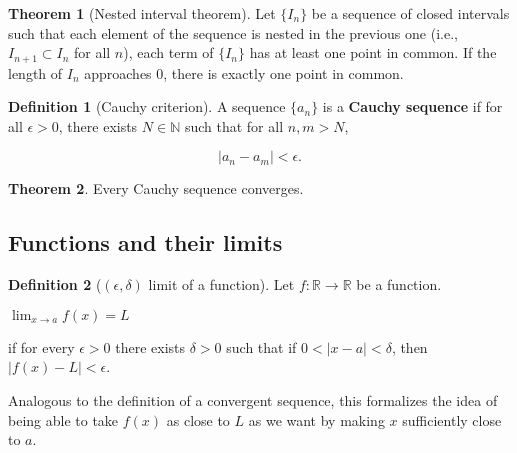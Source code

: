 \documentclass{article}
\theoremstyle{definition}
\newtheorem{definition}{Definition}[section]
\newtheorem{theorem}{Theorem}[section]
\begin{document}
\begin{theorem}[Nested interval theorem]
Let $\{I_n\}$ be a sequence of closed intervals such that each element of the sequence is nested in the previous one (i.e., $I_{n+1} \subset I_n$ for all $n$), each term of $\{I_n\}$ has at least one point in common. If the length of $I_n$ approaches 0, there is exactly one point in common.
\end{theorem}

\begin{definition}[Cauchy criterion]
A sequence $\{a_n\}$ is a \textbf{Cauchy sequence} if for all $\epsilon > 0$, there exists $N \in \mathbb{N}$ such that for all $n, m > N$, 

\begin{equation}
|a_n - a_m| < \epsilon.
\end{equation}
\end{definition}

\begin{theorem}
Every Cauchy sequence converges.
\end{theorem}

\subsection{Functions and their limits}

\begin{definition}[$(\epsilon, \delta)$ limit of a function]

Let $f: \mathbb{R} \to \mathbb{R}$ be a function. 

\begin{center}
$\lim_{x \to a} f(x) = L$
\end{center}

if for every $\epsilon > 0$ there exists $\delta > 0$ such that if $0 < |x-a| <
\delta$, then $|f(x) - L| < \epsilon$.
 
\end{definition}

Analogous to the definition of a convergent sequence, this formalizes the idea of being able to take $f(x)$ as close to $L$ as we want
by making $x$ sufficiently close to $a$.
\end{document}
